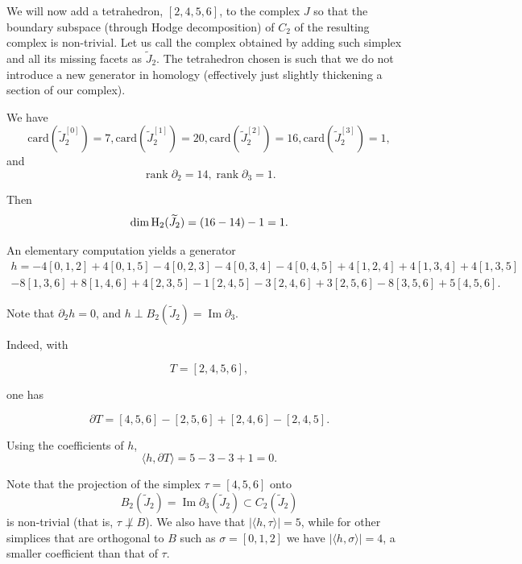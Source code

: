 \documentclass[11pt]{amsart}
\theoremstyle{theorem}
\newtheorem{theorem}{Theorem}
\theoremstyle{remark}
\theoremstyle{definition}
\newcommand{\card}{\mathrm{card}}
\newcommand{\HH}  {\mbox{\rm H}}
\newcommand{\hide}[1]{}
\begin{document}
We will now add a tetrahedron, $[2,4,5,6]$, to the complex $J$ so that the boundary subspace (through Hodge decomposition) of $C_2$ of the resulting complex is non-trivial. Let us call the complex obtained by adding such simplex and all its missing facets as $\widetilde{J}_2$. The tetrahedron chosen is such that we do not introduce a new generator in homology (effectively just slightly thickening a section of our complex). 

We have
\[
\card(\widetilde{J}_2^{[0]})=7,\card(\widetilde{J}_2^{[1]})=20, \card(\widetilde{J}_2^{[2]})=16, \card(\widetilde{J}_2^{[3]})=1,
\]
and
\[
\operatorname{rank}\partial_2=14,
\operatorname{rank}\partial_3=1.
\]

Then 
\[
\dim \HH_2(\widetilde{J}_2)=(16-14)-1=1.
\]



An elementary computation yields a generator 
\[
\begin{split}
h= - 4 [0, 1, 2]+ 4 [0, 1, 5]- 4 [0, 2, 3]- 4 [0, 3, 4]- 4 [0, 4, 5]+ 4 [1, 2, 4]+ 4 [1, 3, 4]+ 4 [1, 3, 5]\\- 8 [1, 3, 6]+ 8 [1, 4, 6]+ 4 [2, 3, 5]- 1 [2, 4, 5]- 3 [2, 4, 6]+ 3 [2, 5, 6]- 8 [3, 5, 6]+ 5 [4, 5, 6].
\end{split}
\]


Note that
$
\partial_2 h=0
$,
and
$
h\perp B_2(\widetilde{J}_2)=\operatorname{Im}\partial_3
$.

Indeed, with

\[
T=[2,4,5,6],
\]

one has

\[
\partial T=[4,5,6]-[2,5,6]+[2,4,6]-[2,4,5].
\]

Using the coefficients of $h$,
\[
\langle h,\partial T\rangle= 5-3-3+1 = 0.
\]



Note that the projection of the simplex $\tau = [4,5,6]$ onto 
\[
B_2(\widetilde{J}_2)=\operatorname{Im}\partial_3(\widetilde{J}_2)\subset C_2(\widetilde{J}_2)
\]
is non-trivial (that is, $\tau \not\perp B$). We also have that $|\langle h, \tau\rangle| = 5 $, while for other simplices that are orthogonal to $B$ such as $\sigma = [0,1,2]$ we have  $|\langle h, \sigma \rangle| = 4$, a smaller coefficient than that of $\tau$. 
\hide{
Thus we have shown that the following is true:

\begin{theorem}\label{thm:base_case}
    There exists a complex $K_2$ of dimension $3$ such that
    \begin{enumerate}[label=(\alph*)]
        \item $\dim \HH_2(K_2) = 1$,
        \item For $h$ a harmonic cycle, there exist simplices $\sigma\perp B$ and $\tau\not\perp B$, where $B$ is the space of $2$-dimensional boundaries, such that $|\langle h, \sigma \rangle| < |\langle h,\tau \rangle|$.
    \end{enumerate}
\end{theorem}
Taking the two-step filtration \(\varnothing\subset K_2\), the unique nonzero
class in \(\HH_2(K_2)\) gives a simple generic infinite bar. The
displayed harmonic cycle is a harmonic representative of this bar.
}
\end{document}
